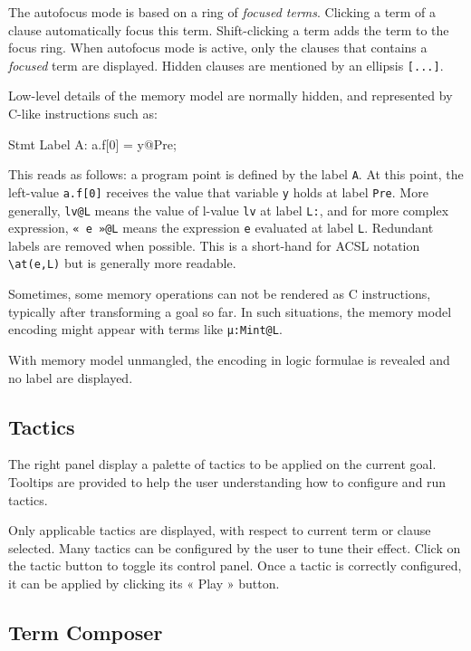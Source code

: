The autofocus mode is based on a ring of \emph{focused terms}. Clicking a term of a clause automatically focus this term. Shift-clicking a term adds the term to the focus ring. When autofocus mode is active, only the clauses that contains a \emph{focused} term are displayed. Hidden clauses are mentioned by an ellipsis \texttt{[...]}.

Low-level details of the memory model are normally hidden, and represented by C-like instructions such as:

\begin{ccode}
   Stmt { Label A: a.f[0] = y@Pre; }
\end{ccode}

This reads as follows: a program point is defined by the label \texttt{A}. At this point, the left-value \texttt{a.f[0]} receives the value that variable \texttt{y} holds at label \texttt{Pre}. More generally, \texttt{lv@L} means the value of l-value \texttt{lv} at label \texttt{L:}, and for more complex expression, \texttt{« e »@L} means the expression \texttt{e} evaluated at label \texttt{L}. Redundant labels are removed when possible. This is a short-hand for \textsf{ACSL} notation \lstinline{\at(e,L)} but is generally more readable.

Sometimes, some memory operations can not be rendered as C instructions, typically after transforming a goal so far. In such situations, the memory model encoding might appear with terms like \texttt{µ:Mint@L}.

With memory model unmangled, the encoding in logic formulae is revealed and no label are displayed.

\subsection{Tactics}

The right panel display a palette of tactics to be applied on the current goal. Tooltips are provided to help the user understanding how to configure and run tactics.

Only applicable tactics are displayed, with respect to current term or clause selected. Many tactics can be configured by the user to tune their effect. Click on the tactic button to toggle its control panel. Once a tactic is correctly configured, it can be applied by clicking its « Play » button.

\subsection{Term Composer}


